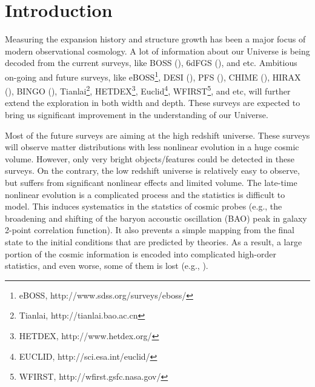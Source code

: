 \documentclass[iop]{emulateapj}
\begin{document}


\section{Introduction}
\label{sec:introduction}

Measuring the expansion history and structure growth has been a major focus of modern observational cosmology.
A lot of information about our Universe is being decoded from the current surveys, like BOSS 
(\cite{BOSScomplete}),
6dFGS (\cite{6dFGS-DR3}), and etc.
Ambitious on-going and future surveys, like eBOSS\footnote{eBOSS, http://www.sdss.org/surveys/eboss/}, DESI 
(\cite{DESIsci}), PFS 
(\cite{PFScosmology}), CHIME
(\cite{Bandura14}), 
HIRAX (\cite{HIRAX16}),
BINGO (\cite{BINGO16}),
Tianlai\footnote{Tianlai, http://tianlai.bao.ac.cn},
HETDEX\footnote{HETDEX, http://www.hetdex.org/}, Euclid\footnote{EUCLID, http://sci.esa.int/euclid/}, WFIRST\footnote{WFIRST, http://wfirst.gsfc.nasa.gov/}, and etc,
 will further extend the exploration in both width and depth.
These surveys are expected to bring us significant improvement in the understanding of our Universe.


Most of the future surveys are aiming at the high redshift universe.
These surveys will observe matter distributions with less nonlinear evolution in a huge cosmic volume.
However, only very bright objects/features could be detected in these surveys.
On the contrary, the low redshift universe is relatively easy to observe, but suffers from significant nonlinear effects and limited volume.
The late-time nonlinear evolution is a complicated process and the statistics is difficult to model.
This induces systematics in the statstics of cosmic probes (e.g., the broadening and shifting of the baryon accoustic oscillation (BAO) peak in galaxy 2-point correlation function).
It also prevents a simple mapping from the final state to the initial conditions that are predicted by theories.
As a result, a large portion of the cosmic information is encoded into complicated high-order statistics, and even worse, some of them is lost (e.g., \cite{Rimes05,Rimes06,Neyrinck06,Carron12a}).
\end{document}
